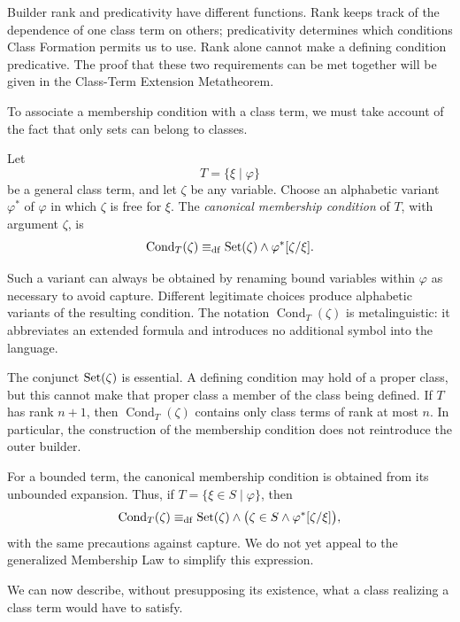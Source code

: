 Builder rank and predicativity have different functions. Rank keeps
track of the dependence of one class term on others; predicativity
determines which conditions Class Formation permits us to use. Rank
alone cannot make a defining condition predicative. The proof that
these two requirements can be met together will be given in the
Class-Term Extension Metatheorem.


To associate a membership condition with a class term, we must take
account of the fact that only sets can belong to classes.

\begin{definition}
\label{def:technical-canonical-membership-condition}
Let
\[
T=\{\xi\mid\varphi\}
\]
be a general class term, and let \(\zeta\) be any variable. Choose
an alphabetic variant \(\varphi^*\) of \(\varphi\) in which
\(\zeta\) is free for \(\xi\). The \emph{canonical membership
condition} of \(T\), with argument \(\zeta\), is
\[
\operatorname{Cond}_T(\zeta)
\mathrel{\equiv_{\mathrm{df}}}
\operatorname{Set}(\zeta)\land\varphi^*[\zeta/\xi].
\]
\end{definition}

Such a variant can always be obtained by renaming bound variables
within \(\varphi\) as necessary to avoid capture. Different
legitimate choices produce alphabetic variants of the resulting
condition. The notation \(\operatorname{Cond}_T(\zeta)\) is
metalinguistic: it abbreviates an extended formula and introduces no
additional symbol into the language.

The conjunct \(\operatorname{Set}(\zeta)\) is essential. A defining condition may
hold of a proper class, but this cannot make that proper class a
member of the class being defined. If \(T\) has rank \(n+1\), then
\(\operatorname{Cond}_T(\zeta)\) contains only class terms of rank at
most \(n\). In particular, the construction of the membership
condition does not reintroduce the outer builder.

For a bounded term, the canonical membership condition is obtained
from its unbounded expansion. Thus, if
\(T=\{\xi\in S\mid\varphi\}\), then
\[
\operatorname{Cond}_T(\zeta)
\mathrel{\equiv_{\mathrm{df}}}
\operatorname{Set}(\zeta)\land
\bigl(\zeta\in S\land\varphi^*[\zeta/\xi]\bigr),
\]
with the same precautions against capture. We do not yet appeal to
the generalized Membership Law to simplify this expression.


We can now describe, without presupposing its existence, what a class
realizing a class term would have to satisfy.

